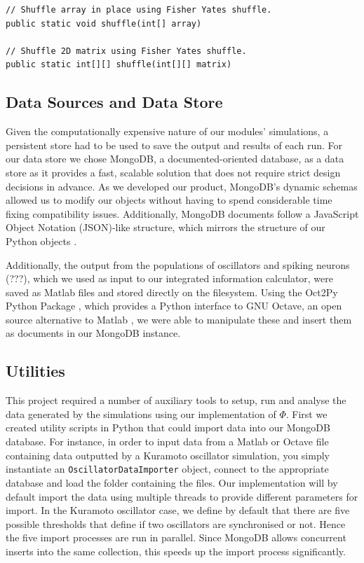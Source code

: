 \documentclass[a4paper,11pt]{article}
\begin{document}
\begin{verbatim}
// Shuffle array in place using Fisher Yates shuffle.
public static void shuffle(int[] array)

// Shuffle 2D matrix using Fisher Yates shuffle.
public static int[][] shuffle(int[][] matrix)
\end{verbatim}

\subsection{Data Sources and Data Store}

Given the computationally expensive nature of our modules' simulations, a persistent store had to be used to save the output and results of each run. For our data store we chose MongoDB, a documented-oriented database, as a data store as it provides a fast, scalable solution that does not require strict design decisions in advance. As we developed our product, MongoDB's dynamic schemas allowed us to modify our objects without having to spend considerable time fixing compatibility issues. Additionally, MongoDB documents follow a JavaScript Object Notation (JSON)-like structure, which mirrors the structure of our Python objects \cite{MongoDB}.

Additionally, the output from the populations of oscillators and spiking neurons (???), which we used as input to our integrated information calculator, were saved as Matlab files and stored directly on the filesystem. Using the Oct2Py Python Package \cite{Silvester}, which provides a Python interface to GNU Octave, an open source alternative to Matlab \cite{Eaton}, we were able to manipulate these and insert them as documents in our MongoDB instance.

\subsection{Utilities}
\label{sec:utils}
This project required a number of auxiliary tools to setup, run and analyse the data generated by the simulations using our implementation of $\Phi$. First we created utility scripts in Python that could import data into our MongoDB database. For instance, in order to input data from a Matlab or Octave file containing data outputted by a Kuramoto oscillator simulation, you simply instantiate an \texttt{OscillatorDataImporter} object, connect to the appropriate database and load the folder containing the files. Our implementation will by default import the data using multiple threads to provide different parameters for import. In the Kuramoto oscillator case, we define by default that there are five possible thresholds that define if two oscillators are synchronised or not. Hence the five import processes are run in parallel. Since MongoDB allows concurrent inserts into the same collection, this speeds up the import process significantly.
\end{document}
